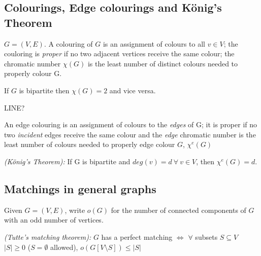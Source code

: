 \documentclass{article}
\begin{document}
\subsection*{Colourings, Edge colourings and K\"onig's Theorem}

\begin{defn}
$G=(V,E)$.  A colouring of $G$ is an assignment of colours to all $v \in V$; the couloring is \emph{proper} if no two adjacent vertices receive the same colour; the chromatic number $\chi (G)$ is the least number of distinct colours needed to properly colour G.
\end{defn}
\begin{examp}
If $G$ is bipartite then $\chi (G) = 2$ and vice versa.
\end{examp}

LINE?

\begin{defn}
An edge colouring is an assignment of colours to the \emph{edges} of G; it is proper if no two \emph{incident} edges receive the same colour and the \emph{edge} chromatic number is the least number of colours needed to properly edge colour $G$, $\chi^e(G)$
\end{defn}

\begin{thm}
\emph{(K\"onig's Theorem):} If G is bipartite and $deg(v)=d ~ \forall ~ v \in V$, then $\chi^e(G)=d$.
\end{thm}

\subsection*{Matchings in general graphs}

\begin{figure}[H]
\centering 

\end{figure}


\begin{defn}
 Given $G=(V,E)$, write $o(G)$ for the number of connected components of $G$ with an odd number of vertices.
\end{defn}

\begin{thm}
\emph{(Tutte's matching theorem):} $G$ has a perfect matching $\iff$ $\forall$ subsets $S \subseteq V$ $|S| \geq 0$ ($S = \emptyset $ allowed), $o(G[V \setminus S]) \leq |S|$
\end{thm}

\end{document}
